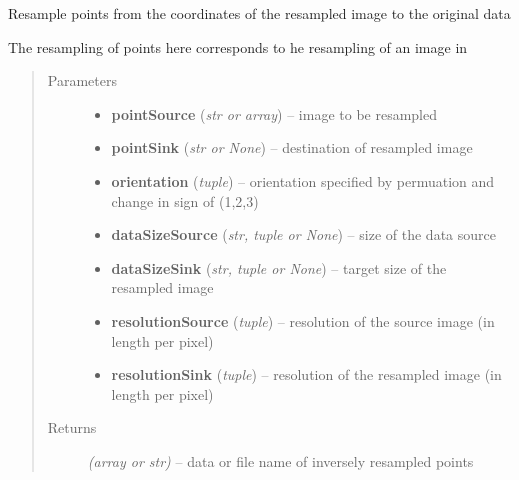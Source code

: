 \documentclass[letterpaper,10pt,english]{sphinxmanual}
\begin{document}
\begin{fulllineitems}
\label{api/ClearMap.Alignment:ClearMap.Alignment.Resampling.resamplePointsInverse}
Resample points from the coordinates of the resampled image to the original data

The resampling of points here corresponds to he resampling of an image in {\hyperref[api/ClearMap.Alignment:ClearMap.Alignment.Resampling.resampleDataInverse]{\emph{}}}
\begin{quote}\begin{description}
\item[{Parameters}] \leavevmode\begin{itemize}
\item {} 
\textbf{pointSource} (\emph{str or array}) --
image to be resampled

\item {} 
\textbf{pointSink} (\emph{str or None}) --
destination of resampled image

\item {} 
\textbf{orientation} (\emph{tuple}) --
orientation specified by permuation and change in sign of (1,2,3)

\item {} 
\textbf{dataSizeSource} (\emph{str, tuple or None}) --
size of the data source

\item {} 
\textbf{dataSizeSink} (\emph{str, tuple or None}) --
target size of the resampled image

\item {} 
\textbf{resolutionSource} (\emph{tuple}) --
resolution of the source image (in length per pixel)

\item {} 
\textbf{resolutionSink} (\emph{tuple}) --
resolution of the resampled image (in length per pixel)

\end{itemize}

\item[{Returns}] \leavevmode
\emph{(array or str)} --
data or file name of inversely resampled points

\end{description}\end{quote}

\end{fulllineitems}
\end{document}
